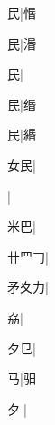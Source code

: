 \begin{multicols}{2}
{{民}\mktsJzrVerticalBar{}{\cjk{}{\cnsym{}　}{\cnsym{}　}{\cnsym{}　}}|{\cjk{}惽}\par
{民}\mktsJzrVerticalBar{}{\cjk{}{\cnsym{}　}{\cnsym{}　}{\cnsym{}　}}|{\cjk{}湣}\par
{民}\mktsJzrVerticalBar{}{\cjk{}{\cnsym{}　}{\cnsym{}　}{\cnsym{}　}}|{}\par
{民}\mktsJzrVerticalBar{}{\cjk{}{\cnsym{}　}{\cnsym{}　}{\cnsym{}　}}|{\cjk{}缗}\par
{民}\mktsJzrVerticalBar{}{\cjk{}{\cnsym{}　}{\cnsym{}　}{\cnsym{}　}}|{\cjk{}緡}\par
{\cjk{}{\cnsym{}　}女民}\mktsJzrVerticalBar{}{\cjk{}{\cnsym{}　}{\cnsym{}　}{\cnsym{}　}}|{}\par
{}\mktsJzrVerticalBar{}{\cjk{}{\cnsym{}　}{\cnsym{}　}{\cnsym{}　}}|{}\par
{\cjk{}{\cnsym{}　}米巴}\mktsJzrVerticalBar{}{\cjk{}{\cnsym{}　}{\cnsym{}　}{\cnsym{}　}}|{}\par
{\cjk{}卄{\cnxHanaA{}罒}{\cnxb{}𠃌}}\mktsJzrVerticalBar{}{\cjk{}{\cnsym{}　}{\cnsym{}　}{\cnsym{}　}}|{}\par
{\cjk{}矛夊力}\mktsJzrVerticalBar{}{\cjk{}{\cnsym{}　}{\cnsym{}　}{\cnsym{}　}}|{}\par
{\cjk{}{\cnsym{}　}{\cnsym{}　}劦}\mktsJzrVerticalBar{}{\cjk{}{\cnsym{}　}{\cnsym{}　}{\cnsym{}　}}|{}\par
{\cjk{}{\cnsym{}　}夕{\cnxa{}㔾}}\mktsJzrVerticalBar{}{\cjk{}{\cnsym{}　}{\cnsym{}　}{\cnsym{}　}}|{}\par
{\cjk{}{\cnsym{}　}{\cnsym{}　}马}\mktsJzrVerticalBar{}{\cjk{}{\cnsym{}　}{\cnsym{}　}{\cnsym{}　}}|{\cjk{}驲}\par
{夕{\cnjzr{}}}\mktsJzrVerticalBar{}{\cjk{}{\cnsym{}　}{\cnsym{}　}{\cnsym{}　}}|{}\par
}
\end{multicols}
